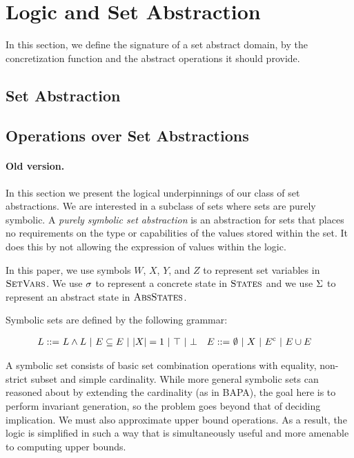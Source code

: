 \section{Logic and Set Abstraction}
\label{sec:logic-and-set-abstraction}
In this section, we define the signature of a set abstract domain, by the
concretization function and the abstract operations it should provide.

\subsection{Set Abstraction}
\label{s:3:1:abs}

\subsection{Operations over Set Abstractions}
\label{s:3:2:sign}

\paragraph{Old version.}

In this section we present the logical underpinnings of our class of set abstractions.  We are interested in a subclass of sets where sets are purely symbolic.  A \emph{purely symbolic set abstraction} is an abstraction for sets that places no requirements on the type or capabilities of the values stored within the set.  It does this by not allowing the expression of values within the logic.

In this paper, we use symbols $W$, $X$, $Y$, and $Z$ to represent set variables in $\textsc{SetVars}$.  We use $\sigma$ to represent a concrete state in $\textsc{States}$ and we use $\Sigma$ to represent an abstract state in $\textsc{AbsStates}$.
\begin{definition}
    Symbolic sets are defined by the following grammar:
    
    \begin{align*}
        L ::= & \ L \wedge L \ | \ E \subseteq E \ | \ |{X}| = 1 \ | \ \top \ | \ \bot &
        E ::= & \ \emptyset \ | \ X \ | \ {E}^{\mathrm{c}} \ | \ E \cup E
    \end{align*}
\end{definition}

A symbolic set consists of basic set combination operations with equality, non-strict subset and simple cardinality.  While more general symbolic sets can reasoned about by extending the cardinality (as in BAPA), the goal here is to perform invariant generation, so the problem goes beyond that of deciding implication.  We must also approximate upper bound operations.  As a result, the logic is simplified in such a way that is simultaneously useful and more amenable to computing upper bounds.

